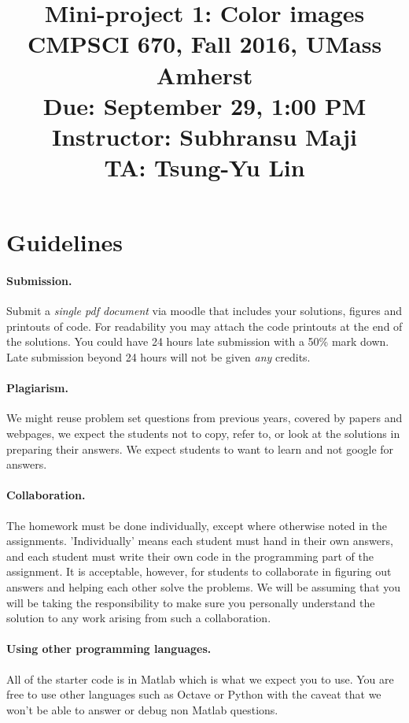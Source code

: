 \documentclass[10pt,letterpaper]{article}
\title{
  \textbf{Mini-project 1: Color images} \\
  \Large{CMPSCI 670, Fall 2016, UMass Amherst} \\
  \Large{Due:  September 29, 1:00 PM } \\
  \Large{Instructor: Subhransu Maji} \\
  \Large{TA: Tsung-Yu Lin}
}
\date{}
\begin{document}
\maketitle

\renewcommand\thesubsection{\thesection.\alph{subsection}}


\section*{Guidelines}

\paragraph{Submission.} Submit a \emph{single pdf document} via moodle that includes your solutions, figures and printouts of code. For readability you may attach the code printouts at the end of the solutions. You could have 24 hours late submission with a 50\% mark down. Late submission beyond 24 hours will not be given \emph{any} credits. 

\paragraph{Plagiarism.} We might reuse problem set questions from previous years, covered by papers and webpages, we expect the students not to copy, refer to, or look at the solutions in preparing their answers. We expect students to want to learn and not google for answers. 

\paragraph{Collaboration.} The homework must be done individually, except where otherwise noted in the assignments. 'Individually' means each student must hand in their own answers, and each student must write their own code in the programming part of the assignment. It is acceptable, however, for students to collaborate in figuring out answers and helping each other solve the problems. We will be assuming that you will be taking the responsibility to make sure you personally understand the solution to any work arising from such a collaboration.

\paragraph{Using other programming languages.} All of the starter code is in Matlab which is what we expect you to use. You are free to use other languages such as Octave or Python with the caveat that we won't be able to answer or debug non Matlab questions.
\end{document}
